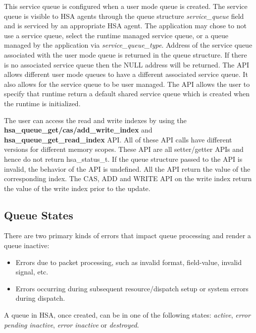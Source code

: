 \documentclass[draft]{book}
\newcommand{\reffun}[1]{\textbf{#1}}
\newcommand{\refarg}[1]{\textit{#1}}
\newcommand{\reffld}[1]{\textit{#1}}
\newcommand{\reftyp}[1]{#1}
\begin{document}
This service queue is configured when a user mode queue is created. The service
queue is visible to HSA agents through the queue structure
\reffld{service_queue} field and is serviced by an appropriate HSA agent. The
application may chose to not use a service queue, select the runtime managed
service queue, or a queue managed by the application via
\refarg{service_queue_type}. Address of the service queue associated with the
user mode queue is returned in the queue structure. If there is no associated
service queue then the NULL address will be returned. The API allows different
user mode queues to have a different associated service queue. It also allows
for the service queue to be user managed. The API allows the user to
specify that runtime return a default shared service queue which is created when
the runtime is initialized.

The user can access the read and write indexes by using the
\reffun{hsa_queue_get/cas/add_write_index} and \reffun{hsa_queue_get_read_index}
API. All of these API calls have different versions for different memory
scopes. These API are all setter/getter APIs and hence do not return
\reftyp{hsa_status_t}. If the queue structure passed to the API is invalid, the
behavior of the API is undefined. All the API return the value of the
corresponding index. The CAS, ADD and WRITE API on the write index return the
value of the write index prior to the update.

\hypertarget{queue-errors}{}\subsection{Queue States} \label{queue-errors}

There are two primary kinds of errors that impact queue processing and render a
queue inactive:
\begin{itemize}
\item Errors due to packet processing, such as invalid format, field-value,
  invalid signal, etc.
\item Errors occurring during subsequent resource/dispatch setup or system
  errors during dispatch.
\end{itemize}

A queue in HSA, once created, can be in one of the following states:
\emph{active}, \emph{error pending inactive}, \emph{error inactive} or
\emph{destroyed}.
\end{document}
